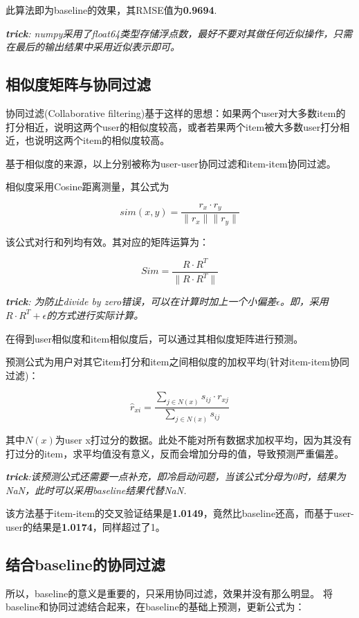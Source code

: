 \documentclass[utf8, a4paper,11pt, onecolumn]{ctexart}
\begin{document}
\begin{spacing}{1.3}
此算法即为baseline的效果，其RMSE值为\textbf{0.9694}.

\textit{\textbf{trick}: numpy采用了float64类型存储浮点数，最好不要对其做任何近似操作，只需在最后的输出结果中采用近似表示即可。}


\subsection{相似度矩阵与协同过滤}

协同过滤(Collaborative filtering)基于这样的思想：如果两个user对大多数item的打分相近，说明这两个user的相似度较高，或者若果两个item被大多数user打分相近，也说明这两个item的相似度较高。

基于相似度的来源，以上分别被称为user-user协同过滤和item-item协同过滤。

相似度采用Cosine距离测量，其公式为

\[sim(x,y) = \frac{r_x \cdot r_y}{\| r_x \| \| r_y\|}\]

该公式对行和列均有效。其对应的矩阵运算为：

\[Sim = \frac{R \cdot R^T}{\| R\cdot R^T \|}\]

\textit{\textbf{trick}: 为防止divide by zero错误，可以在计算时加上一个小偏差$\epsilon$。即，采用$R\cdot R^T + \epsilon$的方式进行实际计算。}

在得到user相似度和item相似度后，可以通过其相似度矩阵进行预测。

预测公式为用户对其它item打分和item之间相似度的加权平均(针对item-item协同过滤)：

\[\hat{r}_{xi} = \frac{\sum_{j \in N(x)} s_{ij} \cdot r_{xj}}{\sum_{j \in N(x)} s_{ij}} \]

其中$N(x)$为user x打过分的数据。此处不能对所有数据求加权平均，因为其没有打过分的item，求平均值没有意义，反而会增加分母的值，导致预测严重偏差。

\textit{\textbf{trick}:该预测公式还需要一点补充，即冷启动问题，当该公式分母为0时，结果为NaN，此时可以采用baseline结果代替NaN.}

该方法基于item-item的交叉验证结果是\textbf{1.0149}，竟然比baseline还高，而基于user-user的结果是\textbf{1.0174}，同样超过了1。

\subsection{结合baseline的协同过滤}
所以，baseline的意义是重要的，只采用协同过滤，效果并没有那么明显。
将baseline和协同过滤结合起来，在baseline的基础上预测，更新公式为：


\end{spacing}
\end{document}
